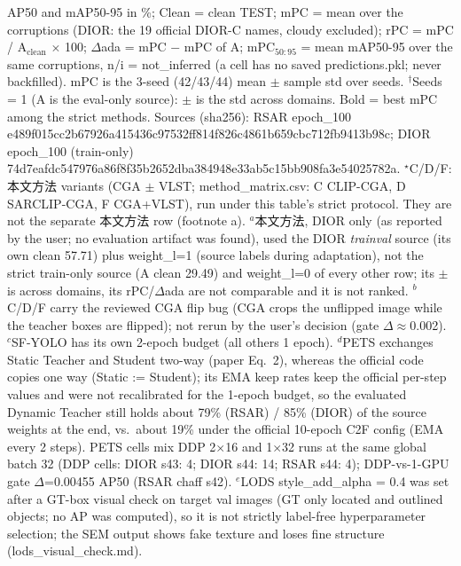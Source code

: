 \begin{table}[t]
\begin{minipage}{\textwidth}
AP50 and mAP50-95 in \%; Clean = clean TEST; mPC = mean over the corruptions (DIOR: the 19 official DIOR-C names, cloudy excluded); rPC = mPC / A$_{\mathrm{clean}}$ $\times$ 100; $\Delta$ada = mPC $-$ mPC of A; mPC$_{50:95}$ = mean mAP50-95 over the same corruptions, n/i = not\_inferred (a cell has no saved predictions.pkl; never backfilled). mPC is the 3-seed (42/43/44) mean $\pm$ sample std over seeds. $^{\dagger}$Seeds = 1 (A is the eval-only source): $\pm$ is the std across domains. Bold = best mPC among the strict methods. Sources (sha256): RSAR epoch\_100 e489f015cc2b67926a415436c97532ff814f826c4861b659cbc712fb9413b98c; DIOR epoch\_100 (train-only) 74d7eafdc547976a86f8f35b2652dba384948e33ab5c15bb908fa3e54025782a. $^{\star}$C/D/F: 本文方法 variants (CGA $\pm$ VLST; method\_matrix.csv: C CLIP-CGA, D SARCLIP-CGA, F CGA+VLST), run under this table's strict protocol. They are not the separate 本文方法 row (footnote a). $^{a}$本文方法, DIOR only (as reported by the user; no evaluation artifact was found), used the DIOR \emph{trainval} source (its own clean 57.71) plus weight\_l=1 (source labels during adaptation), not the strict train-only source (A clean 29.49) and weight\_l=0 of every other row; its $\pm$ is across domains, its rPC/$\Delta$ada are not comparable and it is not ranked. $^{b}$C/D/F carry the reviewed CGA flip bug (CGA crops the unflipped image while the teacher boxes are flipped); not rerun by the user's decision (gate $\Delta\approx$0.002). $^{c}$SF-YOLO has its own 2-epoch budget (all others 1 epoch). $^{d}$PETS exchanges Static Teacher and Student two-way (paper Eq.~2), whereas the official code copies one way (Static := Student); its EMA keep rates keep the official per-step values and were not recalibrated for the 1-epoch budget, so the evaluated Dynamic Teacher still holds about 79\% (RSAR) / 85\% (DIOR) of the source weights at the end, vs.\ about 19\% under the official 10-epoch C2F config (EMA every 2 steps). PETS cells mix DDP 2$\times$16 and 1$\times$32 runs at the same global batch 32 (DDP cells: DIOR s43: 4; DIOR s44: 14; RSAR s44: 4); DDP-vs-1-GPU gate $\Delta$=0.00455 AP50 (RSAR chaff s42). $^{e}$LODS style\_add\_alpha = 0.4 was set after a GT-box visual check on target val images (GT only located and outlined objects; no AP was computed), so it is not strictly label-free hyperparameter selection; the SEM output shows fake texture and loses fine structure (lods\_visual\_check.md).
\end{minipage}
\end{table}
